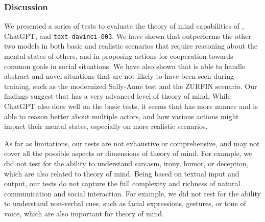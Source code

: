 




\subsubsection{Discussion}
We presented a series of tests to evaluate the theory of mind capabilities of \DV, ChatGPT, and \texttt{text-davinci-003}. We have shown that \DV outperforms the other two models in both basic and realistic scenarios that require reasoning about the mental states of others, and in proposing actions for cooperation towards common goals in social situations. We have also shown that \DV is able to handle abstract and novel situations that are not likely to have been seen during training, such as the modernized Sally-Anne test and the ZURFIN scenario.
Our findings suggest that \DV has a very advanced level of theory of mind. While ChatGPT also does well on the basic tests, it seems that \DV has more nuance and is able to reason better about multiple actors, and how various actions might impact their mental states, especially on more realistic scenarios.

As far as limitations, our tests are not exhaustive or comprehensive, and may not cover all the possible aspects or dimensions of theory of mind. For example, we did not test for the ability to understand sarcasm, irony, humor, or deception, which are also related to theory of mind.
Being based on textual input and output, our tests do not capture the full complexity and richness of natural communication and social interaction. For example, we did not test for the ability to understand non-verbal cues, such as facial expressions, gestures, or tone of voice, which are also important for theory of mind.